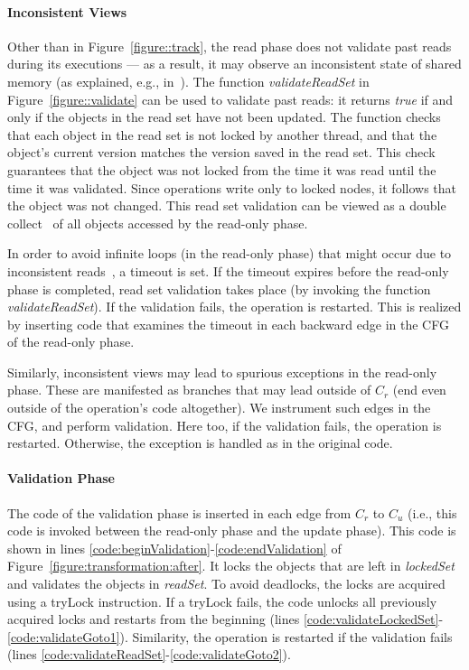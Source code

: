\paragraph{Inconsistent Views}
Other than in Figure~\ref{figure::track}, the read phase does not validate past reads during its executions ---
as a result, it may observe an inconsistent state of shared memory (as explained, e.g., in~\cite{HLR:SLCA2010}).
%
The function \emph{validateReadSet} in Figure~\ref{figure::validate} can be used to validate past reads: it returns \emph{true} if and only if the objects in the read set have not been updated.
%
The function checks that each object in the read set is not locked by another thread,
and that the object's current version matches the version saved in the
read set.
This check guarantees that the object was not locked from the time it was read until
the time it was validated.
Since operations write only to
locked nodes, it follows that the object was not changed.
This read set validation can be viewed as a double collect~\cite{Afek:1993:ASS:153724.153741}
of all objects accessed by the read-only phase.

In order to avoid infinite loops (in the read-only phase) that might occur due to inconsistent reads~\cite{HLR:SLCA2010}, a timeout is set.
If the timeout expires before the read-only phase is completed, read set
validation takes place (by invoking the function \emph{validateReadSet}). If the validation fails, the operation is restarted.
This is realized by inserting code that examines the timeout in each backward edge in the CFG of the read-only phase.

Similarly, inconsistent views may lead to spurious exceptions in the read-only phase. These are manifested as branches that
may lead outside of $C_r$ (end even outside of the operation's code altogether). We instrument such edges in the CFG, and
perform validation. Here too, if the validation fails, the operation is restarted. Otherwise, the exception is handled as in
the original code.


\paragraph{Validation Phase}
The code of the validation phase is inserted in each edge from $C_r$ to $C_u$ (i.e., this code is invoked between the read-only phase and the update phase).
This code is shown in lines \ref{code:beginValidation}-\ref{code:endValidation} of Figure~\ref{figure:transformation:after}.
It locks the objects that are left in \emph{lockedSet} and validates the objects in \emph{readSet}.
To avoid deadlocks, the locks are acquired using a tryLock
instruction.
If a tryLock fails, the code unlocks  all
previously acquired locks and restarts from the beginning
(lines \ref{code:validateLockedSet}-\ref{code:validateGoto1}).
Similarity, the operation is restarted if the validation fails (lines \ref{code:validateReadSet}-\ref{code:validateGoto2}).

